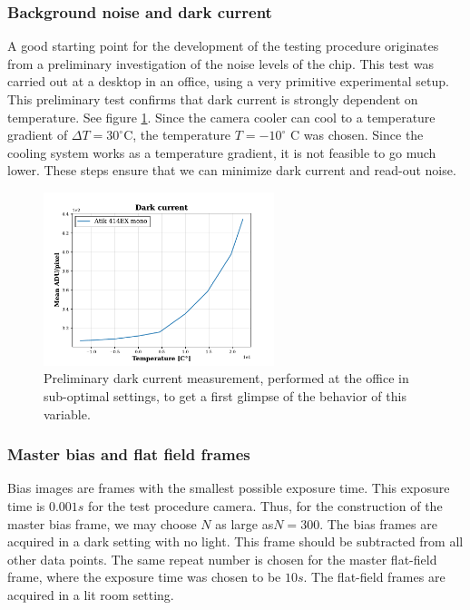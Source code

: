 \documentclass[../main.tex]{subfiles}
\begin{document}
		\subsubsection{Background noise and dark current}
		A good starting point for the development of the testing procedure originates from a preliminary investigation of the noise levels of the chip. This test was carried out at a desktop in an office, using a very primitive experimental setup. This preliminary test confirms that dark current is strongly dependent on temperature. See figure \ref{fig:dcprelim}. Since the camera cooler can cool to a temperature gradient of $\Delta T = 30 ^\circ $C, the temperature $T = -10 ^\circ$ C was chosen. Since the cooling system works as a temperature gradient, it is not feasible to go much lower. These steps ensure that we can minimize dark current and read-out noise.
		\begin{figure}
			\centering
			\includegraphics[width=0.6\textwidth]{dark_current_versus_temperature.pdf}
			\caption{Preliminary dark current measurement, performed at the office in sub-optimal settings, to get a first glimpse of the behavior of this variable.}
			\label{fig:dcprelim}
		\end{figure}
		
		\subsubsection{Master bias and flat field frames}
		Bias images are frames with the smallest possible exposure time. This exposure time is $0.001s$ for the test procedure camera. Thus, for the construction of the master bias frame, we may choose $N$ as large as$N = 300$.  The bias frames are acquired in a dark setting with no light. This frame should be subtracted from all other data points. The same repeat number is chosen for the master flat-field frame, where the exposure time was chosen to be $10s$.  The flat-field frames are acquired in a lit room setting. 
		
\end{document}
